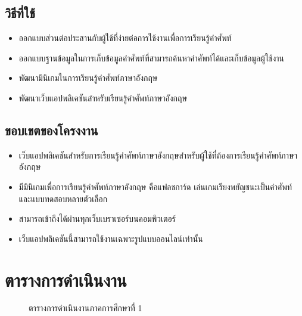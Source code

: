 \documentclass[12pt,oneside,openright,a4paper]{cpe-thai-project}
\begin{document}
\subsection{วิธีที่ใช้}

\begin{itemize}
	\item  ออกแบบส่วนต่อประสานกับผู้ใช้ที่ง่ายต่อการใช้งานเพื่อการเรียนรู้คำศัพท์
	\item  ออกแบบฐานข้อมูลในการเก็บข้อมูลคำศัพท์ที่สามารถค้นหาคำศัพท์ได้และเก็บข้อมูลผู้ใช้งาน
	\item  พัฒนามินิเกมในการเรียนรู้คำศัพท์ภาษาอังกฤษ
	\item  พัฒนาเว็บแอปพลิเคชันสำหรับเรียนรู้คำศัพท์ภาษาอังกฤษ
\end{itemize}

\subsection{ขอบเขตของโครงงาน}

\begin{itemize}
	\item  เว็บแอปพลิเคชันสำหรับการเรียนรู้คำศัพท์ภาษาอังกฤษสำหรับผู้ใช้ที่ต้องการเรียนรู้คำศัพท์ภาษาอังกฤษ
	\item  มีมินิเกมเพื่อการเรียนรู้คำศัพท์ภาษาอังกฤษ คือแฟลชการ์ด เล่นเกมเรียงพยัญชนะเป็นคำศัพท์ และแบบทดสอบหลายตัวเลือก
	\item  สามารถเข้าถึงได้ผ่านทุกเว็บเบราเซอร์บนคอมพิวเตอร์
	\item  เว็บแอปพลิเคชันนี้สามารถใช้งานเฉพาะรูปแบบออนไลน์เท่านั้น
\end{itemize}

\section{ตารางการดำเนินงาน}

\begin{figure}[!h]\centering
	\caption{ตารางการดำเนินงานภาคการศึกษาที่ 1}\label{fig:plan}
\end{figure}
\end{document}
